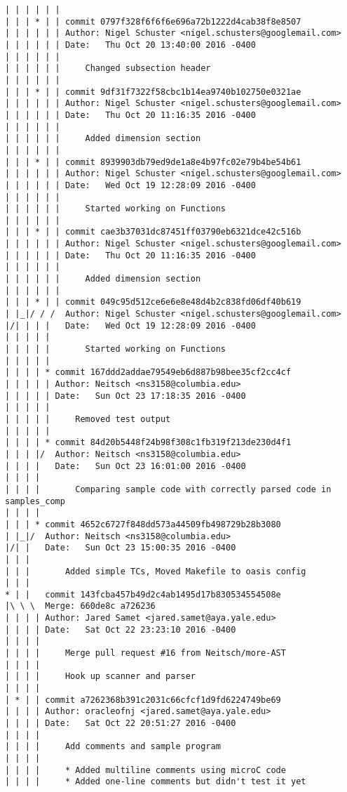 \begin{lstlisting}
| | | | | |       
| | | * | | commit 0797f328f6f6f6e696a72b1222d4cab38f8e8507
| | | | | | Author: Nigel Schuster <nigel.schusters@googlemail.com>
| | | | | | Date:   Thu Oct 20 13:40:00 2016 -0400
| | | | | | 
| | | | | |     Changed subsection header
| | | | | |       
| | | * | | commit 9df31f7322f58cbc1b14ea9740b102750e0321ae
| | | | | | Author: Nigel Schuster <nigel.schusters@googlemail.com>
| | | | | | Date:   Thu Oct 20 11:16:35 2016 -0400
| | | | | | 
| | | | | |     Added dimension section
| | | | | |       
| | | * | | commit 8939903db79ed9de1a8e4b97fc02e79b4be54b61
| | | | | | Author: Nigel Schuster <nigel.schusters@googlemail.com>
| | | | | | Date:   Wed Oct 19 12:28:09 2016 -0400
| | | | | | 
| | | | | |     Started working on Functions
| | | | | |       
| | | * | | commit cae3b37031dc87451ff03790eb6321dce42c516b
| | | | | | Author: Nigel Schuster <nigel.schusters@googlemail.com>
| | | | | | Date:   Thu Oct 20 11:16:35 2016 -0400
| | | | | | 
| | | | | |     Added dimension section
| | | | | |       
| | | * | | commit 049c95d512ce6e6e8e48d4b2c838fd06df40b619
| |_|/ / /  Author: Nigel Schuster <nigel.schusters@googlemail.com>
|/| | | |   Date:   Wed Oct 19 12:28:09 2016 -0400
| | | | |   
| | | | |       Started working on Functions
| | | | |      
| | | | * commit 167ddd2addae79549eb6d887b98bee35cf2cc4cf
| | | | | Author: Neitsch <ns3158@columbia.edu>
| | | | | Date:   Sun Oct 23 17:18:35 2016 -0400
| | | | | 
| | | | |     Removed test output
| | | | |      
| | | | * commit 84d20b5448f24b98f308c1fb319f213de230d4f1
| | | |/  Author: Neitsch <ns3158@columbia.edu>
| | | |   Date:   Sun Oct 23 16:01:00 2016 -0400
| | | |   
| | | |       Comparing sample code with correctly parsed code in samples_comp
| | | |     
| | | * commit 4652c6727f848dd573a44509fb498729b28b3080
| |_|/  Author: Neitsch <ns3158@columbia.edu>
|/| |   Date:   Sun Oct 23 15:00:35 2016 -0400
| | |   
| | |       Added simple TCs, Moved Makefile to oasis config
| | |      
* | |   commit 143fcba457b49d2c4ab1495d17b830534554508e
|\ \ \  Merge: 660de8c a726236
| | | | Author: Jared Samet <jared.samet@aya.yale.edu>
| | | | Date:   Sat Oct 22 23:23:10 2016 -0400
| | | | 
| | | |     Merge pull request #16 from Neitsch/more-AST
| | | |     
| | | |     Hook up scanner and parser
| | | |     
| * | | commit a7262368b391c2031c66cfcf1d9fd6224749be69
| | | | Author: oracleofnj <jared.samet@aya.yale.edu>
| | | | Date:   Sat Oct 22 20:51:27 2016 -0400
| | | | 
| | | |     Add comments and sample program
| | | |     
| | | |     * Added multiline comments using microC code
| | | |     * Added one-line comments but didn't test it yet

\end{lstlisting}

